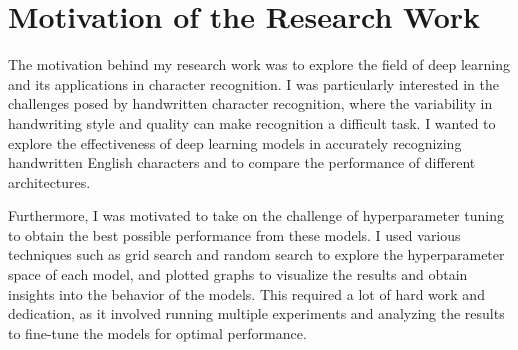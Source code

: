 \section{Motivation of the Research Work}\label{sec1.1}
The motivation behind my research work was to explore the field of deep learning and its applications in character recognition. I was particularly interested in the challenges posed by handwritten character recognition, where the variability in handwriting style and quality can make recognition a difficult task. I wanted to explore the effectiveness of deep learning models in accurately recognizing handwritten English characters and to compare the performance of different architectures.

Furthermore, I was motivated to take on the challenge of hyperparameter tuning to obtain the best possible performance from these models. I used various techniques such as grid search and random search to explore the hyperparameter space of each model, and plotted graphs to visualize the results and obtain insights into the behavior of the models. This required a lot of hard work and dedication, as it involved running multiple experiments and analyzing the results to fine-tune the models for optimal performance.

